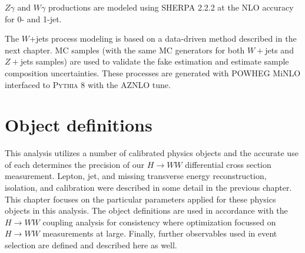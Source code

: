 $Z\gamma$ and $W\gamma$ productions are modeled using \textsc{SHERPA} 2.2.2 at the NLO accuracy for 0- and 1-jet.

The $W$+jets process modeling is based on a data-driven method described in the next chapter. MC samples (with the same MC generators for both $W+$jets and $Z+$jets samples) are used to validate the fake estimation and estimate sample composition uncertainties. These processes are generated with \textsc{POWHEG} MiNLO interfaced to \textsc{Pythia 8} with the AZNLO tune. 

\section{Object definitions}
This analysis utilizes a number of calibrated physics objects and the accurate use of each determines the precision of our $H\rightarrow WW$ differential cross section measurement. Lepton, jet, and missing transverse energy reconstruction, isolation, and calibration were described in some detail in the previous chapter. This chapter focuses on the particular parameters applied for these physics objects in this analysis. The object definitions are used in accordance with the $H\rightarrow WW$ coupling analysis for consistency where optimization focussed on $H \rightarrow WW$ measurements at large. Finally, further observables used in event selection are defined and described here as well. 

